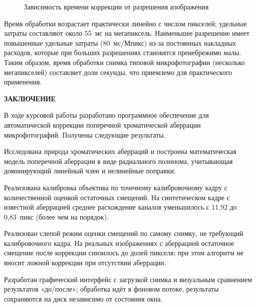 \documentclass[a4paper,14pt,oneside]{extreport}
\newcommand{\structural}[1]{%
  \clearpage
  \addcontentsline{toc}{section}{#1}%
  {\centering\bfseries #1\par}%
  \vspace{\baselineskip}%
}
\begin{document}
\begin{figure}[H]
\centering
{}
\caption{Зависимость времени коррекции от разрешения изображения}
\label{fig:time}
\end{figure}

Время обработки возрастает практически линейно с числом пикселей;
удельные затраты составляют около 55~мс на мегапиксель. Наименьшее
разрешение имеет повышенные удельные затраты (80~мс/Мпикс) из-за
постоянных накладных расходов, которые при больших разрешениях становятся
пренебрежимо малы. Таким образом, время обработки снимка типовой
микрофотографии (несколько мегапикселей) составляет доли секунды, что
приемлемо для практического применения.

\structural{ЗАКЛЮЧЕНИЕ}

В ходе курсовой работы разработано программное обеспечение для
автоматической коррекции поперечной хроматической аберрации
микрофотографий. Получены следующие результаты.

Исследована природа хроматических аберраций и построена математическая
модель поперечной аберрации в виде радиального полинома, учитывающая
доминирующий линейный член и нелинейные поправки.

Реализована калибровка объектива по точечному калибровочному кадру с
количественной оценкой остаточных смещений. На синтетическом кадре с
известной аберрацией среднее расхождение каналов уменьшилось с 11,92 до
0,83~пикс (более чем на порядок).

Реализован слепой режим оценки смещений по самому снимку, не требующий
калибровочного кадра. На реальных изображениях с аберрацией остаточное
смещение после коррекции снизилось до долей пикселя; при этом алгоритм не
вносит ложной коррекции при отсутствии аберрации.

Разработан графический интерфейс с загрузкой снимка и визуальным
сравнением результатов «до/после»; обработка идёт в фоновом потоке,
результаты сохраняются на диск независимо от состояния окна.
\end{document}
